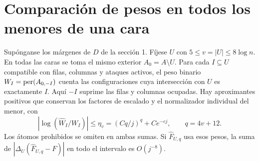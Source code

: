 \section{Comparación de pesos en todos los menores de una cara}
\begin{proposicion}\label{prop:m}
Supónganse los márgenes de \(D\) de la sección 1. Fíjese \(U\) con
\(5\le v=|U|\le8\log n\). En todas las caras se toma el mismo exterior \(A_0=A\setminus U\).
Para cada \(I\subseteq U\) compatible con filas, columnas y ataques activos, el peso binario
\(W_I=\operatorname{per}(A_{0,-I})\) cuenta las configuraciones cuya intersección con \(U\) es exactamente
\(I\). Aquí \(-I\) suprime las filas y columnas ocupadas. Hay aproximantes positivos que
conservan los factores de escalado y el normalizador individual del menor, con
\[
 \left|\log(\widehat W_I/W_I)\right|\le \eta_v=(Cq/j)^q+Ce^{-c j},
 \qquad q=4v+12 .
\]
Los átomos prohibidos se omiten en ambas sumas. Si \(\widehat F_{U,q}\) usa esos pesos,
la suma de \(|\Delta_U(\widehat F_{U,q}-F)|\) en todo el intervalo es \(O(j^{-8})\).
\end{proposicion}
